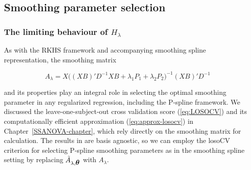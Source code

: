 

\subsection{Smoothing parameter selection}

%
\subsubsection{The limiting behaviour of $H_\lambda$}

As with the RKHS framework and accompanying smoothing spline representation, the smoothing matrix  

\begin{equation}\label{eq:pspline-smoothing-matrix}
A_\lambda = X \big( \left(X B\right)' D^{-1} XB +  \lambda_1 P_1+ \lambda_2 P_2 \big)^{-1}\left(X B\right)' D^{-1}
\end{equation}

\noindent
and its properties play an integral role in selecting the optimal smoothing parameter in any regularized regression, including the P-spline framework. We discussed the leave-one-subject-out cross validation score (\ref{eq:LOSOCV}) and its computationally efficient approximation (\ref{eq:approx-losocv}) in Chapter~\ref{SSANOVA-chapter}, which rely directly on the smoothing matrix for calculation. The results in \cite{xu2012asymptotic} are basis agnostic, so we can employ the losoCV criterion for selecting P-spline smoothing parameters as in the smoothing spline setting by replacing $\tilde{A}_{\lambda,\mbox{\boldmath $\theta$}}$ with $A_\lambda$. 

